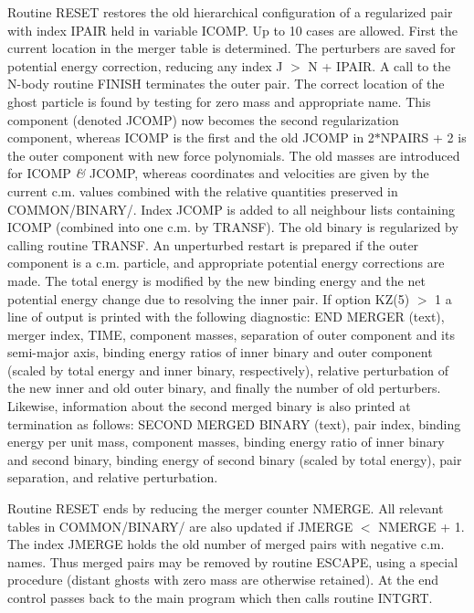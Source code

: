  Routine RESET restores the old hierarchical configuration of a regularized pair with index IPAIR                
   held in variable ICOMP.  Up to 10 cases are allowed.  First the current location in the merger table                 
   is determined.  The perturbers are saved for potential energy correction, reducing any index J $>$ N +                 
   IPAIR.  A call to the N-body routine FINISH terminates the outer pair.  The correct location of the                  
   ghost particle is found by testing for zero mass and appropriate name.  This component (denoted                      
   JCOMP) now becomes the second regularization component, whereas ICOMP is the first and the old JCOMP                 
   in 2$\ast$NPAIRS + 2 is the outer component with new force polynomials.  The old masses are introduced for                
   ICOMP {\it\&} JCOMP, whereas coordinates and velocities are given by the current c.m. values combined with                 
   the relative quantities preserved in COMMON/BINARY/.  Index JCOMP is added to all neighbour lists                    
   containing ICOMP (combined into one c.m. by TRANSF).  The old binary is regularized by calling                   
  routine TRANSF.  An unperturbed restart is prepared if the outer
  component is a c.m. particle, and appropriate potential energy
  corrections are made.
   The total energy is modified by the new binding energy and the net potential                 
   energy change
   due to resolving the inner pair.  If option KZ(5) $>$ 1 a line of output is printed with the                    
   following diagnostic:  END MERGER (text), merger index, TIME, component masses, separation of outer                  
   component and its semi-major axis, binding energy ratios of inner binary and outer component (scaled                 
   by total energy and inner binary, respectively), relative perturbation of the new inner and old outer                
   binary, and finally the number of old perturbers.                                                                    
 Likewise, information about the second merged binary is also
 printed at termination as follows: SECOND MERGED BINARY (text),
 pair index, binding energy per unit mass, component masses, binding
 energy ratio of inner binary and second binary, binding energy of
 second binary (scaled by total energy), pair separation, and
 relative perturbation.

 Routine RESET ends by reducing the merger counter NMERGE.  All relevant tables in COMMON/BINARY/                
   are also updated if JMERGE $<$ NMERGE + 1.  The index JMERGE holds the old number of merged pairs with                 
   negative c.m. names.  Thus merged pairs may be removed by routine ESCAPE, using a special                        
   procedure (distant ghosts with zero mass are otherwise retained).  At the end control                    
   passes back to the main program which then calls routine INTGRT.                                                                             
\bye

